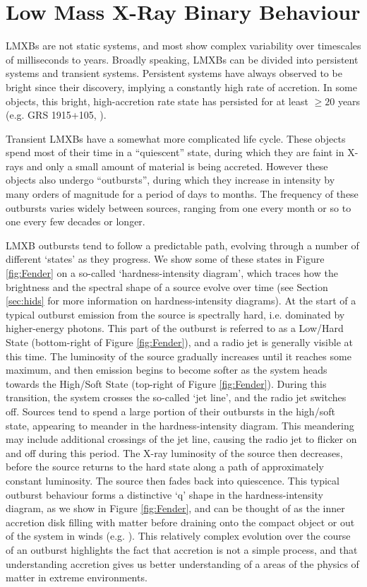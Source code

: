 \section{Low Mass X-Ray Binary Behaviour}

\par LMXBs are not static systems, and most show complex variability over timescales of milliseconds to years.  Broadly speaking, LMXBs can be divided into persistent systems and transient systems.  Persistent systems have always observed to be bright since their discovery, implying a constantly high rate of accretion.  In some objects, this bright, high-accretion rate state has persisted for at least $\geq20$ years (e.g. GRS 1915+105, \citealp{Deegan_1915}).
\par Transient LMXBs have a somewhat more complicated life cycle.  These objects spend most of their time in a ``quiescent'' state, during which they are faint in X-rays and only a small amount of material is being accreted.  However these objects also undergo ``outbursts'', during which they increase in intensity by many orders of magnitude for a period of days to months.  The frequency of these outbursts varies widely between sources, ranging from one every month or so to one every few decades or longer.
\par LMXB outbursts tend to follow a predictable path, evolving through a number of different `states' as they progress.  We show some of these states in Figure \ref{fig:Fender} on a so-called `hardness-intensity diagram', which traces how the brightness and the spectral shape of a source evolve over time (see Section \ref{sec:hids} for more information on hardness-intensity diagrams).  At the start of a typical outburst emission from the source is spectrally hard, i.e. dominated by higher-energy photons.  This part of the outburst is referred to as a Low/Hard State (bottom-right of Figure \ref{fig:Fender}), and a radio jet is generally visible at this time.  The luminosity of the source gradually increases until it reaches some maximum, and then emission begins to become softer as the system heads towards the High/Soft State (top-right of Figure \ref{fig:Fender}).  During this transition, the system crosses the so-called `jet line', and the radio jet switches off.  Sources tend to spend a large portion of their outbursts in the high/soft state, appearing to meander in the hardness-intensity diagram.  This meandering may include additional crossings of the jet line, causing the radio jet to flicker on and off during this period.  The X-ray luminosity of the source then decreases, before the source returns to the hard state along a path of approximately constant luminosity.  The source then fades back into quiescence.  This typical outburst behaviour forms a distinctive `q' shape in the hardness-intensity diagram, as we show in Figure \ref{fig:Fender}, and can be thought of as the inner accretion disk filling with matter before draining onto the compact object or out of the system in winds (e.g. \citealp{Fender_UniJets}).  This relatively complex evolution over the course of an outburst highlights the fact that accretion is not a simple process, and that understanding accretion gives us better understanding of a areas of the physics of matter in extreme environments.

